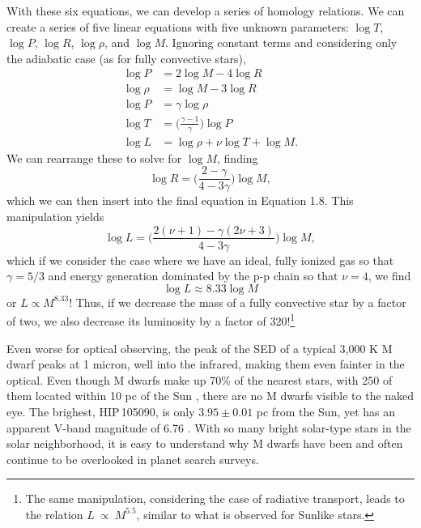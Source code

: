 With these six equations, we can develop a series of homology relations. We can create
a series of five linear equations with five unknown parameters: $\log T$, $\log P$, 
$\log R$, $\log \rho$, and $\log M$.
Ignoring constant terms and considering only the adiabatic case (as for fully 
convective stars),
\begin{align}
\log P &= 2 \log M - 4 \log R \nonumber \\
\log \rho &= \log M - 3 \log R \nonumber \\
\log P &= \gamma \log \rho \\
\log T &= \bigg(\frac{\gamma - 1}{\gamma}\bigg) \log P \nonumber \\
\log L &= \log \rho + \nu \log T + \log M \nonumber.
\end{align}
We can rearrange these to solve for $\log M$, finding
\begin{equation}
\log R = \bigg(\frac{2-\gamma}{4 - 3\gamma}\bigg) \log M,
\end{equation}
which we can then insert into the final equation in Equation 1.8.
This manipulation yields
\begin{equation}
\log L = \bigg(\frac{2(\nu + 1) - \gamma(2\nu + 3)}{4 - 3\gamma}\bigg) \log M,
\end{equation}
which if we consider the case where we have an ideal, fully ionized gas so that $\gamma = 5/3$ and energy generation dominated by the p-p chain so that $\nu = 4$, we find
\begin{equation}
\log L \approx 8.33 \log M
\end{equation}
or $L \propto M^{8.33}$! Thus, if we decrease the mass of a fully convective star by a factor of two, 
we also decrease its luminosity by a factor of 320!\footnote{The same manipulation,
considering the case of radiative transport, leads to the relation $L~\propto~M^{5.5}$,
similar to what is observed for Sunlike stars.} 

Even worse for optical observing,
the peak of the SED of a typical 3,000 K M dwarf peaks at 1 micron, well into the infrared, making them even fainter in the optical.
Even though M dwarfs make up 70\% of the nearest stars, with 250 of them located within
10 pc of the Sun \citep[e.g.][]{Henry06}, there are no M dwarfs visible to the naked 
eye.
The brighest, HIP\,105090, is only $3.95 \pm 0.01$ pc from the Sun, yet has an apparent V-band magnitude of 6.76 \citep{vanLeeuwen07}.
With so many bright solar-type stars in the solar neighborhood, it is easy to understand why M dwarfs have been and often continue to be overlooked in planet search
surveys. 

